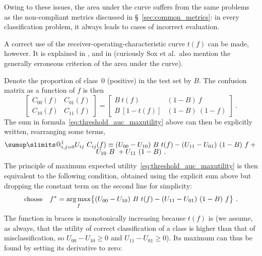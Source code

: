 \documentclass[\ifafour a4paper,12pt,\else a5paper,10pt,\fi%
onecolumn,oneside,article,%
british%
]{memoir}
\makeatletter
\theoremstyle{remark}
\theoremstyle{innote}
\def\sum{\DOTSI\sumop\slimits@}
\renewcommand*{\ge}{\geqslant}%
\DeclarePairedDelimiter\set{\{}{\}} %
\renewcommand*{\|}[1][]{\nonscript\:#1\vert\nonscript\:\mathopen{}}
\newcommand*{\sect}{\S}%
\newcommand*{\etal}{{et al.}}
\DeclareMathOperator*{\argmax}{arg\,max}
\makeatother
\begin{document}
Owing to these issues, the area under the curve suffers from the same problems as the non-compliant metrics discussed in \sect~\ref{sec:common_metrics}: in every classification problem, it always leads to cases of incorrect evaluation.

A correct use of the receiver-operating-characteristic curve $t(f)$ can be made, however. It is explained in \cite[section \emph{Cost/Benefit Analysis} p.~295]{metz1978}, and in \cite[\sect~5.7.4]{soxetal1988_r2013} (curiously Sox \etal\ also mention the generally erroneous criterion of the area under the curve).

Denote the proportion of class~$0$ (positive) in the test set by $B$. The confusion matrix as a function of $f$ is then
\begin{equation}
  \label{eq:CM_fromrates}
  \begin{bmatrix}
    C_{00}(f) & C_{01}(f)\\ C_{10}(f) & C_{11}(f)
  \end{bmatrix}
  =
  \begin{bmatrix}
    B\ t(f) & (1-B)\ f \\ B\ [1-t(f)] &(1-B)\ (1-f)
  \end{bmatrix} \ .
\end{equation}
The sum in formula~\eqref{eq:threshold_auc_maxutility} above can then be explicitly written, rearranging some terms,
\begin{multline}
  \label{eq:sum_UC}
  \sum_{i,j=0}^{1} U_{ij}\ C_{ij}(f) \equiv
      (U_{00} - U_{10})\  B\ t(f) -
    (U_{11} - U_{01})\ (1-B)\ f
    +{}\\[-2\jot]
    U_{10}\ B\ + U_{11}\ (1-B) \ .
\end{multline}
The principle of maximum expected utility~\eqref{eq:threshold_auc_maxutility} is  then equivalent to the following condition, obtained using the explicit sum above but dropping the constant term on the second line for simplicity:
\begin{equation}
  \label{eq:threshold_auc_maxutility_rates}
  \text{\small choose}\quad
  f^{*} = \argmax_{f}\set[\big]{
    (U_{00} - U_{10})\  B\ t(f) -
    (U_{11} - U_{01})\ (1-B)\ f
} \ .
  \end{equation}
The function in braces is monotonically increasing because $t(f)$ is (we assume, as always, that the utility of correct classification of a class is higher than that of misclassification, so $U_{00}-U_{10} \ge 0$ and $U_{11}-U_{01} \ge 0$). Its maximum can thus be found by setting its derivative to zero:
\end{document}
